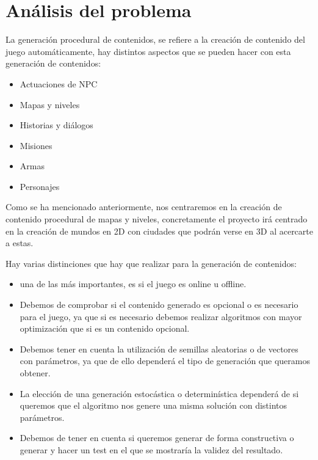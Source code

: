 \chapter[Análisis del problema]{\label{identificadorReferenciaCruzada}
Análisis del problema}

La generación procedural de contenidos, se refiere a la creación de contenido del juego automáticamente, hay distintos aspectos que se pueden hacer con esta generación de contenidos\cite{B1}:

\begin{itemize}
	\item Actuaciones de NPC
	\item Mapas y niveles
	\item Historias y diálogos
	\item Misiones
	\item Armas
	\item Personajes
\end{itemize}


Como se ha mencionado anteriormente, nos centraremos en la creación de contenido procedural de mapas y niveles, concretamente el proyecto irá centrado en la creación de mundos en 2D con ciudades que podrán verse en 3D al acercarte a estas.

Hay varias distinciones que hay que realizar para la generación de contenidos\cite{B2}:

\begin{itemize}

\item una de las más importantes, es si el juego es online u offline\cite{B2}.

\item Debemos de comprobar si el contenido generado es opcional o es necesario para el juego, ya que si es necesario debemos realizar algoritmos con mayor optimización que si es un contenido opcional\cite{B2}.

\item Debemos tener en cuenta la utilización de  semillas aleatorias o de vectores con parámetros, ya que de ello dependerá el tipo de generación que queramos obtener\cite{B2}.

\item La elección de una generación estocástica o determinística dependerá de si queremos que el algoritmo nos genere una misma solución con distintos parámetros\cite{B2}.

\item Debemos de tener en cuenta si queremos generar de forma constructiva o generar y hacer un test en el que se mostraría la validez del resultado\cite{B2}.

\end{itemize}

